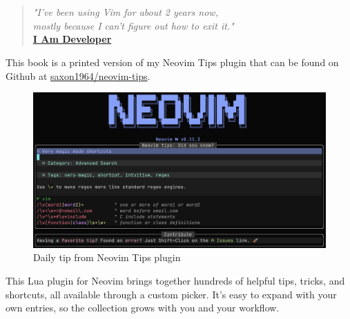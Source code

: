 \chapter*{}
\vspace{-1.5cm}
    \begin{minipage}[r]{.95\textwidth}\raggedleft
    \HUGE\bfseries\IntroductionName
    \end{minipage}
\vspace{2.5cm}

\noindent

\begin{quote}
  {
    \raggedleft
    \textit{"I've been using Vim for about 2 years now,\\mostly because I can't figure out how to exit it."}\\

    \raggedleft
    \textbf{\href{https://x.com/iamdevloper/status/435555976687923200}{I Am Developer}}\\
  }
\end{quote}

This book is a printed version of my Neovim Tips plugin that can be found on Github at
\href{https://github.com/saxon1964/neovim-tips}{saxon1964/neovim-tips}.

\begin{figure}[h]
  \centering
  \includegraphics[width=\textwidth]{Structure/Images/s1.png}
  \vspace{-2em}
  \caption*{Daily tip from Neovim Tips plugin}
\end{figure}

This Lua plugin for Neovim brings together hundreds of helpful tips, tricks, and shortcuts, all available through a custom picker. It's easy to expand with your own entries, so the collection grows with you and your workflow.


